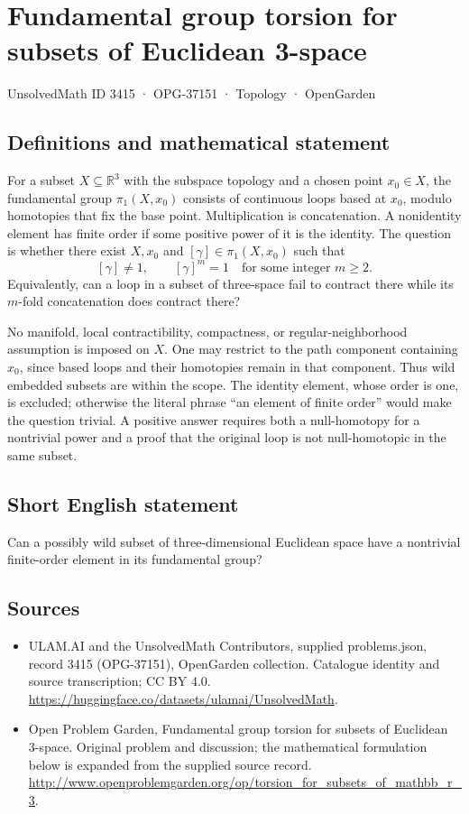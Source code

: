 \documentclass[11pt,a4paper]{article}
\begin{document}
\section*{Fundamental group torsion for subsets of Euclidean 3-space}\label{3415}
{\small UnsolvedMath ID 3415 · OPG-37151 · Topology · OpenGarden}
\subsection{Definitions and mathematical statement}
For a subset $X\subseteq\mathbb R^3$ with the subspace topology and
a chosen point $x_0\in X$, the fundamental group $\pi_1(X,x_0)$
consists of continuous loops based at $x_0$, modulo homotopies that
fix the base point. Multiplication is concatenation. A nonidentity
element has finite order if some positive power of it is the identity.
The question is whether there exist $X,x_0$ and $[\gamma]\in\pi_1(X,x_0)$
such that
\[
                     [\gamma]\ne1,\qquad [\gamma]^m=1
                        \quad\text{for some integer }m\ge2.
\]
Equivalently, can a loop in a subset of three-space fail to contract
there while its $m$-fold concatenation does contract there?

No manifold, local contractibility, compactness, or regular-neighborhood
assumption is imposed on $X$. One may restrict to the path component
containing $x_0$, since based loops and their homotopies remain in
that component. Thus wild embedded subsets are within the scope.
The identity element, whose order is one, is excluded; otherwise
the literal phrase ``an element of finite order'' would make the
question trivial. A positive answer requires both a null-homotopy
for a nontrivial power and a proof that the original loop is not
null-homotopic in the same subset.
\subsection{Short English statement}
Can a possibly wild subset of three-dimensional Euclidean space have a nontrivial finite-order element in its fundamental group?
\subsection{Sources}
\begin{itemize}
\item[S1] ULAM.AI and the UnsolvedMath Contributors, supplied problems.json, record 3415 (OPG-37151), OpenGarden collection. Catalogue identity and source transcription; CC BY 4.0.
\url{https://huggingface.co/datasets/ulamai/UnsolvedMath}.
\item[S2] Open Problem Garden, Fundamental group torsion for subsets of Euclidean 3-space. Original problem and discussion; the mathematical formulation below is expanded from the supplied source record.
\url{http://www.openproblemgarden.org/op/torsion_for_subsets_of_mathbb_r_3}.
\end{itemize}
\end{document}
